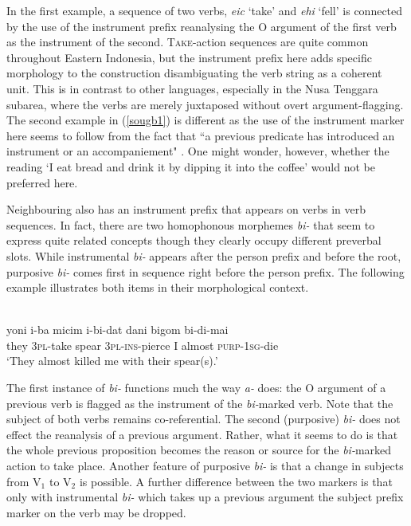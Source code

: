 In the first example, a sequence of two verbs, \textit{eic} `take' and \textit{ehi} `fell' is connected by the use of the instrument prefix reanalysing the O argument of the first verb as the instrument of the second. \textsc{Take}-action sequences are quite common throughout Eastern Indonesia, but the instrument prefix here adds specific morphology to the construction disambiguating the verb string as a coherent unit. This is in contrast to other languages, especially in the Nusa Tenggara subarea, where the verbs are merely juxtaposed without overt argument-flagging. The second example in (\ref{sougb1}) is different as the use of the instrument marker here seems to follow from the fact that ``a previous predicate has introduced an instrument or an accompaniement" \citep[205]{reesink2002grammar}. One might wonder, however, whether the reading `I eat bread and drink it by dipping it into the coffee' would not be preferred here.

Neighbouring  also has an instrument prefix that appears on verbs in verb sequences. In fact, there are two homophonous morphemes \textit{bi-} that seem to express quite related concepts though they clearly occupy different preverbal slots. While instrumental \textit{bi-} appears after the person prefix and before the root, purposive \textit{bi-} comes first in sequence right before the person prefix. The following example illustrates both items in their morphological context.

\ea 
{}\\
\gll yoni i-ba micim i-bi-dat dani bigom bi-di-mai \\
they \textsc{3}\textsc{pl}-take spear \textsc{3}\textsc{pl}-\textsc{ins}-pierce I almost \textsc{purp}-\textsc{1}\textsc{sg}-die \\
\glft `They almost killed me with their spear(s).' 
\z

The first instance of \textit{bi-} functions much the way  \textit{a-} does: the O argument of a previous verb is flagged as the instrument of the \textit{bi-}marked verb. Note that the subject of both verbs remains co-referential. The second (purposive) \textit{bi-} does not effect the reanalysis of a previous argument. Rather, what it seems to do is that the whole previous proposition becomes the reason or source for the \textit{bi-}marked action to take place. Another feature of purposive \textit{bi-} is that a change in subjects from V$_1$ to V$_2$ is possible. A further difference between the two markers is that only with instrumental \textit{bi-} which takes up a previous argument the subject prefix marker on the verb may be dropped.

